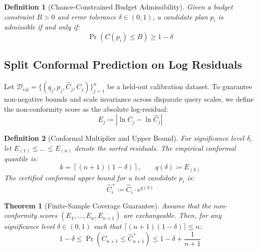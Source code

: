 \documentclass[journal,10pt,onecolumn]{article}
\newtheorem{theorem}{Theorem}
\newtheorem{definition}{Definition}
\begin{document}
\begin{definition}[Chance-Constrained Budget Admissibility]
Given a budget constraint $B > 0$ and error tolerance $\delta \in (0, 1)$, a candidate plan $p_i$ is admissible if and only if:
\begin{equation}
    \Pr\left( C(p_i) \le B \right) \ge 1 - \delta
\end{equation}
\end{definition}

\subsection{Split Conformal Prediction on Log Residuals}
Let $\mathcal{D}_{\text{cal}} = \{(q_j, p_j, \hat{C}_j, C_j)\}_{j=1}^n$ be a held-out calibration dataset. To guarantee non-negative bounds and scale invariance across disparate query scales, we define the non-conformity score as the absolute log-residual:
\begin{equation}
    E_j \coloneqq \left| \ln C_j - \ln \hat{C}_j \right|
\end{equation}

\begin{definition}[Conformal Multiplier and Upper Bound]
For significance level $\delta$, let $E_{(1)} \le \dots \le E_{(n)}$ denote the sorted residuals. The empirical conformal quantile is:
\begin{equation}
    k = \left\lceil (n + 1)(1 - \delta) \right\rceil, \qquad q(\delta) \coloneqq E_{(k)}
\end{equation}
The certified conformal upper bound for a test candidate $p_i$ is:
\begin{equation}
    \hat{C}_i^+ \coloneqq \hat{C}_i \cdot e^{q(\delta)}
\end{equation}
\end{definition}

\begin{theorem}[Finite-Sample Coverage Guarantee]
\label{thm:main_coverage}
Assume that the non-conformity scores $(E_1, \dots, E_n, E_{n+1})$ are exchangeable. Then, for any significance level $\delta \in (0, 1)$ such that $\lceil(n+1)(1-\delta)\rceil \le n$:
\begin{equation}
    1 - \delta \le \Pr\left( C_{n+1} \le \hat{C}_{n+1}^+ \right) \le 1 - \delta + \frac{1}{n+1}
\end{equation}
\end{theorem}
\end{document}
